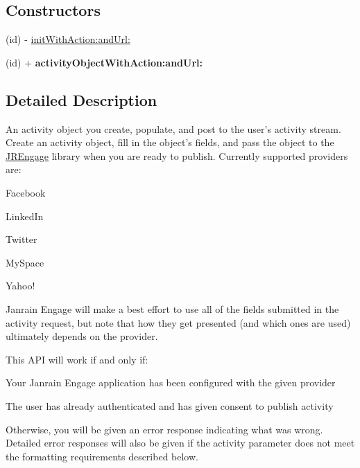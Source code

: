 \subsection*{Constructors}
\label{_amgrp559a25fdb98a7d1fd1c3771ac568d5e9}
 \begin{DoxyCompactItemize}
\item 
(id) -\/ \hyperlink{interface_j_r_activity_object_a61195dc95162d1136d41af3a5f15fe2d}{initWithAction:andUrl:}
\item 
\hypertarget{interface_j_r_activity_object_a7bfe16e0799ff6c07548ef8aeb778a51}{
(id) + {\bfseries activityObjectWithAction:andUrl:}}
\label{interface_j_r_activity_object_a7bfe16e0799ff6c07548ef8aeb778a51}

\end{DoxyCompactItemize}


\subsection{Detailed Description}
An activity object you create, populate, and post to the user's activity stream. Create an activity object, fill in the object's fields, and pass the object to the \hyperlink{interface_j_r_engage}{JREngage} library when you are ready to publish. Currently supported providers are:
\begin{DoxyItemize}
\item Facebook
\item LinkedIn
\item Twitter
\item MySpace
\item Yahoo!
\end{DoxyItemize}

Janrain Engage will make a best effort to use all of the fields submitted in the activity request, but note that how they get presented (and which ones are used) ultimately depends on the provider.

This API will work if and only if:
\begin{DoxyItemize}
\item Your Janrain Engage application has been configured with the given provider
\item The user has already authenticated and has given consent to publish activity
\end{DoxyItemize}

Otherwise, you will be given an error response indicating what was wrong. Detailed error responses will also be given if the activity parameter does not meet the formatting requirements described below.


